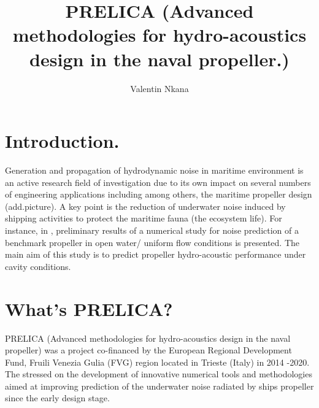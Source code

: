 \documentclass[12pt,a4paper,twoside]{article}
\author{Valentin Nkana}
\title{PRELICA (Advanced methodologies for hydro-acoustics design in the naval propeller.)}
\begin{document}
	
\maketitle
	
	
\section{Introduction.}

Generation and propagation of hydrodynamic noise in maritime environment is an active research field of investigation due to its own impact on several numbers of engineering applications including among others, the maritime propeller design (add.picture). A key point is the reduction of underwater noise induced by shipping activities to protect the maritime fauna (the ecosystem life). For instance, in \cite{sezen2020numerical}, preliminary results of a numerical study for noise prediction of a benchmark propeller in open water/ uniform flow conditions is presented. The main aim of this study is to predict propeller hydro-acoustic performance under cavity conditions.

\section{What's PRELICA?}

PRELICA (Advanced methodologies for hydro-acoustics design in the naval propeller) was a project co-financed by the European Regional Development Fund, Fruili Venezia Gulia (FVG) region located in Trieste (Italy) in 2014 -2020. The stressed on the development of innovative numerical tools and methodologies aimed at improving prediction of the underwater noise radiated by ships propeller since the early design stage.   





\end{document}
